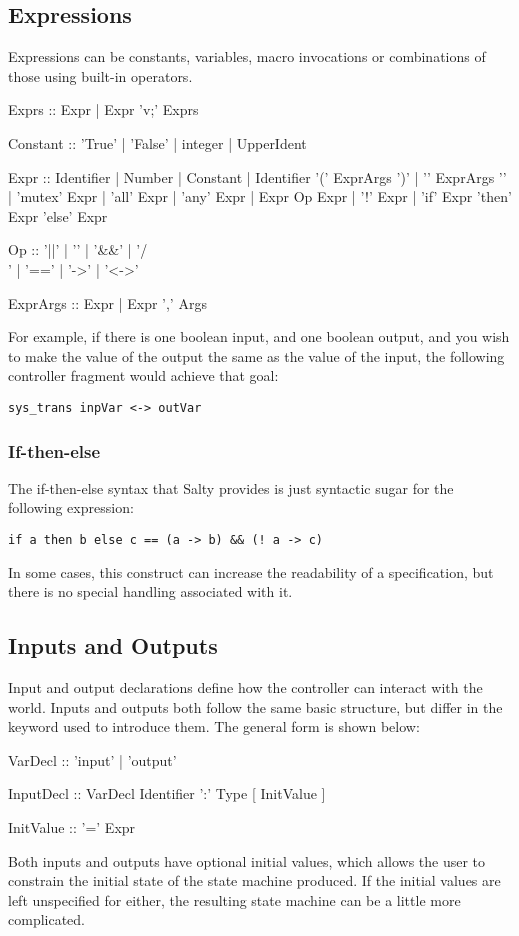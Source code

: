 \subsection{Expressions}

Expressions can be constants, variables, macro invocations or combinations of those 
using built-in operators.
\begin{Grammar}
    Exprs :: Expr | Expr 'v;' Exprs

    Constant :: 'True' | 'False' | integer | UpperIdent

    Expr :: Identifier | Number | Constant | Identifier '(' ExprArgs ')'
     | '{' ExprArgs '}' | 'mutex' Expr | 'all' Expr | 'any' Expr
     | Expr Op Expr | '!' Expr
     | 'if' Expr 'then' Expr 'else' Expr

    Op :: '||' | '\/' | '\&\&' | '/\\' | '==' | '->' | '<->'

    ExprArgs :: Expr | Expr ',' Args
\end{Grammar}

For example, if there is one boolean input, and one boolean output, and you wish to 
make the value of the output the same as the value of the input, the following 
controller fragment would achieve that goal:

\begin{lstlisting}
sys_trans inpVar <-> outVar
\end{lstlisting}
\subsubsection{If-then-else}

The if-then-else syntax that Salty provides is just syntactic sugar for the following 
expression:
\begin{lstlisting}
if a then b else c == (a -> b) && (! a -> c)
\end{lstlisting}
In some cases, this construct can increase the readability of a specification, 
but there is no special handling associated with it.

\subsection{Inputs and Outputs}

Input and output declarations define how the controller can interact with the world. 
Inputs and outputs both follow the same basic structure, but differ in the keyword 
used to introduce them. The general form is shown below:
\begin{Grammar}
  VarDecl :: 'input' | 'output'

  InputDecl :: VarDecl Identifier ':' Type [ InitValue ]

  InitValue :: '=' Expr
\end{Grammar}
Both inputs and outputs have optional initial values, which allows the user to 
constrain the initial state of the state machine produced. If the initial values 
are left unspecified for either, the resulting state machine can be a little more 
complicated.

